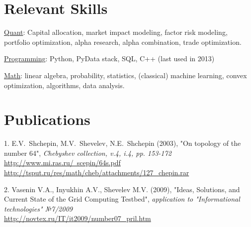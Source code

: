 \documentclass[unicode,a4paper,10pt]{article}
\begin{document}
\section{Relevant Skills}
\underline{Quant}: Capital allocation, market impact modeling, factor risk modeling, portfolio optimization, alpha research, alpha combination, trade optimization.

\underline{Programming}: Python, PyData stack, SQL, C++ (last used in 2013)

\underline{Math}: linear algebra, probability, statistics, (classical) machine learning, convex optimization, algorithms, data analysis.


 

\section{Publications}
1. E.V.~Shchepin, M.V.~Shevelev, N.E.~Shchepin (2003), "On topology of the number 64",
\textit{Chebyshev collection, v.4, i.4, pp. 153-172}\\
\href{http://www.mi.ras.ru/~scepin/64s.pdf}{http://www.mi.ras.ru/~scepin/64s.pdf}\\
\href{http://tsput.ru/res/math/cheb/attachments/127_chepin.rar}{http://tsput.ru/res/math/cheb/attachments/127\_chepin.rar}

2. Vasenin V.A., Inyukhin A.V., Shevelev M.V. (2009), "Ideas, Solutions, and Current State of the Grid Computing Testbed", 
\textit{application to "Informational technologies" №7/2009}\\
\href{http://novtex.ru/IT/it2009/number07\_pril.htm}{http://novtex.ru/IT/it2009/number07\_pril.htm}
\end{document}
